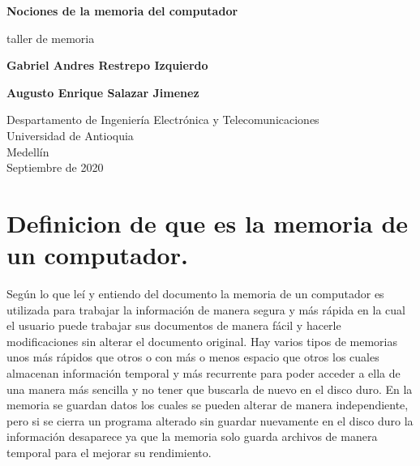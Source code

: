 \documentclass{article}
\begin{document}
\begin{titlepage}
    \begin{center}
        \vspace*{1cm}
            
        \Huge
        \textbf{Nociones de la memoria del computador}
            
        \vspace{0.5cm}
        \LARGE
        taller de memoria
            
        \vspace{1.5cm}
            
        \textbf{Gabriel Andres Restrepo Izquierdo}
        
        \vspace{1,5cm}

        \textbf{Augusto Enrique Salazar Jimenez}
        \vfill
            
        \vspace{0.8cm}
            
        \Large
        Despartamento de Ingeniería Electrónica y Telecomunicaciones\\
        Universidad de Antioquia\\
        Medellín\\
        Septiembre de 2020
            
    \end{center}
\end{titlepage}

\tableofcontents

\newpage

\section{Definicion de que es la memoria de un computador.}
        \vspace{0.8cm}
Según lo que leí y entiendo del documento la memoria de un computador es utilizada para trabajar la información de manera segura y más rápida en la cual el usuario puede trabajar sus documentos de manera fácil y hacerle modificaciones sin alterar el documento original.
        \vspace{0.8cm}
Hay varios tipos de memorias unos más rápidos que otros o con más o menos espacio que otros los cuales almacenan información temporal y más recurrente para poder acceder a ella de una manera más sencilla y no tener que buscarla de nuevo en el disco duro.
        \vspace{0.8cm}
En la memoria se guardan datos los cuales se pueden alterar de manera independiente, pero si se cierra un programa alterado sin guardar nuevamente en el disco duro la información desaparece ya que la memoria solo guarda archivos de manera temporal para el mejorar su rendimiento.  
\end{document}
